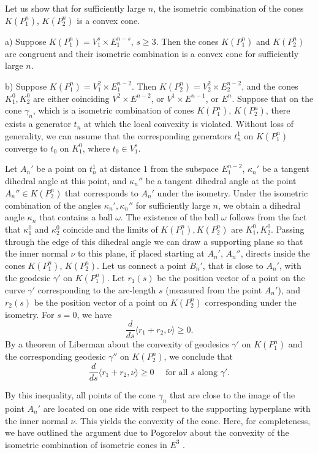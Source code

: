 \documentclass[11pt,oneside]{amsart}
\theoremstyle{theorem}
\theoremstyle{definition}
\theoremstyle{remark}
\begin{document}
Let us show that for sufficiently large $n$, the isometric combination of the cones $K(P_1^n)$, $K(P_2^n)$ is a convex cone.

a) Suppose $K(P_1^n) = V_1^s \times E_1^{n-s}$, $s \ge 3$. Then the cones $K(P_1^n)$ and $K(P_2^n)$ are congruent and their isometric combination is a convex cone for sufficiently large $n$.

b) Suppose $K(P_1^n) = V_1^2 \times E_1^{n-2}$. Then $K(P_2^n) = V_2^2 \times E_2^{n-2}$, and the cones $K_1^0, K_2^0$ are either coinciding $V^2 \times E^{n-2}$, or $V^1 \times E^{n-1}$, or $E^n$. Suppose that on the cone $\gamma_n$, which is a isometric combination of cones $K(P_1^n)$, $K(P_2^n)$, there exists a generator $t_n$ at which the local convexity is violated. Without loss of generality, we can assume that the corresponding generators $t_n^1$ on $K(P_1^n)$ converge to $t_0$ on $K_1^0$, where $t_0 \in V_1^s$. 

Let $A_n'$ be a point on $t_n^1$ at distance $1$ from the subspace $E_1^{n-2}$, $\kappa_n'$ be a tangent dihedral angle at this point, and $\kappa_n''$ be a tangent dihedral angle at the point $A_n'' \in K(P_2^n)$ that corresponds to $A_n'$ under the isometry. Under the isometric combination of the angles $\kappa_n', \kappa_n''$ for sufficiently large $n$, we obtain a dihedral angle $\kappa_n$ that contains a ball $\omega$. The existence of the ball $\omega$ follows from the fact that $\kappa_1^0$ and $\kappa_2^0$ coincide and the limits of $K(P_1^n), K(P_2^n)$ are $K_1^0, K_2^0$. Passing through the edge of this dihedral angle we can draw a supporting plane so that the inner normal $\nu$ to this plane, if placed starting at $A_n'$, $A_n''$, directs inside the cones $K(P_1^n)$, $K(P_2^n)$. Let us connect a point $B_n'$, that is close to $A_n'$, with the geodesic $\gamma'$ on $K(P_1^n)$. Let $r_1(s)$ be the position vector of a point on the curve $\gamma'$ corresponding to the arc-length $s$ (measured from the point $A_n'$), and $r_2(s)$ be the position vector of a point on $K(P_2^n)$ corresponding under the isometry. For $s=0$, we have
\[
\frac{d}{ds}\langle r_1 + r_2, \nu \rangle \ge 0.
\]  
By a theorem of Liberman about the convexity of geodesics $\gamma'$ on $K(P_1^n)$ and the corresponding geodesic $\gamma''$ on $K(P_2^n)$, we conclude that
\[
\frac{d}{ds} \langle r_1 + r_2, \nu \rangle \ge 0 \quad \text{ for all }s \text{ along }\gamma'.
\]

By this inequality, all points of the cone $\gamma_n$ that are close to the image of the point $A_n'$ are located on one side with respect to the supporting hyperplane with the inner normal $\nu$. This yields the convexity of the cone. Here, for completeness, we have outlined the argument due to Pogorelov about the convexity of the isometric combination of isometric cones in $E^3$ \cite{Pog}. 
\end{document}
